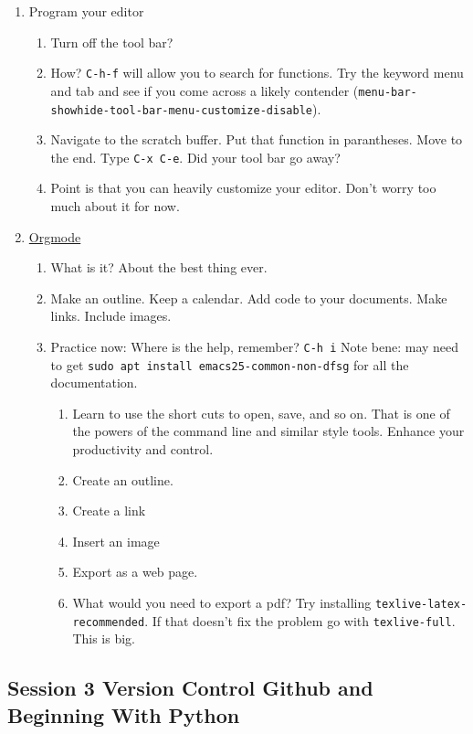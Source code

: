 \documentclass{article}
\begin{document}
\begin{enumerate}
\begin{enumerate}
\item Program your editor
\begin{enumerate}
\item Turn off the tool bar?
\item How? \texttt{C-h-f} will allow you to search for functions. Try the keyword menu and tab and see if you come across a likely contender (\texttt{menu-bar-showhide-tool-bar-menu-customize-disable}).
\item Navigate to the scratch buffer. Put that function in parantheses. Move to the end. Type \texttt{C-x C-e}. Did your tool bar go away?
\item Point is that you can heavily customize your editor. Don't worry too much about it for now.
\end{enumerate}
\item \href{org\#Top}{Orgmode}
\begin{enumerate}
\item What is it? About the best thing ever.
\item Make an outline. Keep a calendar. Add code to your documents. Make links. Include images.
\item Practice now:
Where is the help, remember? \texttt{C-h i}
Note bene: may need to get \texttt{sudo apt install emacs25-common-non-dfsg} for all the documentation. 
\begin{enumerate}
\item Learn to use the short cuts to open, save, and so on. That is one of the powers of the command line and similar style tools. Enhance your productivity and control.
\item Create an outline.
\item Create a link
\item Insert an image
\item Export as a web page.
\item What would you need to export a pdf?
Try installing \texttt{texlive-latex-recommended}. If that doesn't fix the problem go with \texttt{texlive-full}. This is big.
\end{enumerate}
\end{enumerate}
\end{enumerate}
\end{enumerate}
\subsection{Session 3 Version Control Github and Beginning With Python}
\label{sec:org2f2ad3a}
\end{document}

